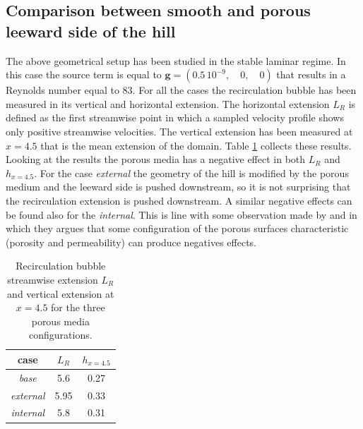 \subsection{Comparison between smooth and porous leeward side of the hill}

The above geometrical setup has been studied in the stable laminar regime. In this case the source term is equal to $\mathbf{g} = (0.5 \,10^{-9}, \quad0, \quad0)$ that results in a Reynolds number equal to $83$.
For all the cases the recirculation bubble has been measured in its vertical and horizontal extension. The horizontal extension $L_R$ is defined as the first streamwise point in which a sampled velocity profile shows only positive streamwise velocities. The vertical extension has been measured at $x=4.5$ that is the mean extension of the domain.
Table \ref{tb:bubble} collects these results. Looking at the results the porous media has a negative effect in both $L_R$ and $h_{x=4.5}$. For the case \textit{external} the geometry of the hill is modified by the porous medium and the leeward side is pushed downstream, so it is not surprising that the recirculation extension is pushed downstream. A similar negative effects can be found also for the \textit{internal}. This is line with some observation made by \citet{jimenez2001turbulent} and \citet{segura2017permeable} in which they argues that some configuration of the porous surfaces characteristic (porosity and permeability) can produce negatives effects.

\begin{table}[h]
	\centering
	\begin{tabular}{c|c|c}
		case & $L_R$ & $h_{x=4.5}$ \\ 
		\hline 
		\hline 
		\textit{base} & 5.6 & 0.27 \\ 
		\hline 
		\textit{external} & 5.95 & 0.33 \\ 
		\hline 
		\textit{internal} & 5.8 & 0.31 \\ 
		\hline 
		\hline 
	\end{tabular}
	\caption{Recirculation bubble streamwise extension $L_R$ and vertical extension at $x=4.5$ for the three porous media configurations.}
	\label{tb:bubble}
\end{table}


